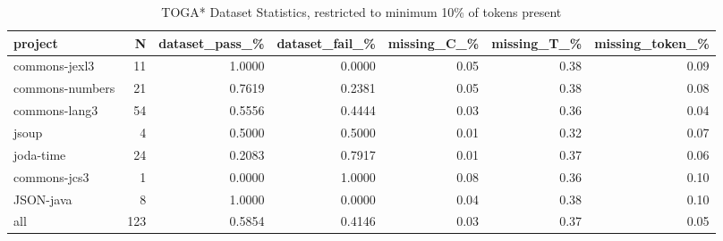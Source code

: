 \begin{table*}
\centering
\caption{TOGA* Dataset Statistics, restricted to minimum 10\% of tokens present}
\label{tab:toga_stats_10}
\begin{tabular}{lrrrrrr}
\toprule
         project &    N &  dataset\_pass\_\% &  dataset\_fail\_\% &  missing\_C\_\% &  missing\_T\_\% &  missing\_token\_\% \\
\midrule
   commons-jexl3 &   11 &          1.0000 &          0.0000 &         0.05 &         0.38 &             0.09 \\
 commons-numbers &   21 &          0.7619 &          0.2381 &         0.05 &         0.38 &             0.08 \\
   commons-lang3 &   54 &          0.5556 &          0.4444 &         0.03 &         0.36 &             0.04 \\
           jsoup &    4 &          0.5000 &          0.5000 &         0.01 &         0.32 &             0.07 \\
       joda-time &   24 &          0.2083 &          0.7917 &         0.01 &         0.37 &             0.06 \\
    commons-jcs3 &    1 &          0.0000 &          1.0000 &         0.08 &         0.36 &             0.10 \\
       JSON-java &    8 &          1.0000 &          0.0000 &         0.04 &         0.38 &             0.10 \\
             all &  123 &          0.5854 &          0.4146 &         0.03 &         0.37 &             0.05 \\
\bottomrule
\end{tabular}
\end{table*}
